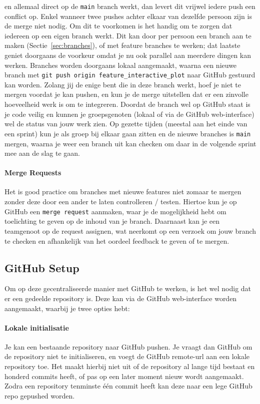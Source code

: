 en allemaal direct op de \texttt{main} branch werkt, dan levert dit vrijwel iedere push een conflict op. Enkel wanneer twee pushes achter elkaar van dezelfde persoon zijn is de merge niet nodig. Om dit te voorkomen is het handig om te zorgen dat iedereen op een eigen branch werkt. Dit kan door per persoon een branch aan te maken (Sectie~\ref{sec:branches}), of met feature branches te werken; dat laatste geniet doorgaans de voorkeur omdat je nu ook parallel aan meerdere dingen kan werken. Branches worden doorgaans lokaal aangemaakt, waarna een nieuwe branch met \texttt{git push origin feature\_interactive\_plot} naar GitHub gestuurd kan worden. Zolang jij de enige bent die in deze branch werkt, hoef je niet te mergen voordat je kan pushen, en kun je de merge uitstellen dat er een zinvolle hoeveelheid werk is om te integreren. Doordat de branch wel op GitHub staat is je code veilig en kunnen je groepsgenoten (lokaal of via de GitHub web-interface) wel de status van jouw werk zien. Op gezette tijden (meestal aan het einde van een sprint) kun je als groep bij elkaar gaan zitten en de nieuwe branches is \texttt{main} mergen, waarna je weer een branch uit kan checken om daar in de volgende sprint mee aan de slag te gaan.

\paragraph{Merge Requests} Het is good practice om branches met nieuwe features niet zomaar te mergen zonder deze door een ander te laten controlleren / testen. Hiertoe kun je op GitHub een \texttt{merge request} aanmaken, waar je de mogelijkheid hebt om toelichting te geven op de inhoud van je branch. Daarnaast kan je een teamgenoot op de request assignen, wat neerkomt op een verzoek om jouw branch te checken en afhankelijk van het oordeel feedback te geven of te mergen.

\subsection{GitHub Setup}
Om op deze gecentraliseerde manier met GitHub te werken, is het wel nodig dat er een gedeelde repository is. Deze kan via de GitHub web-interface worden aangemaakt, waarbij je twee opties hebt: 
\paragraph{Lokale initialisatie} Je kan een bestaande repository naar GitHub pushen. Je vraagt dan GitHub om de repository niet te initialiseren, en voegt de GitHub remote-url aan een lokale repository toe. Het maakt hierbij niet uit of de repository al lange tijd bestaat en honderd commits heeft, of pas op een later moment nieuw wordt aangemaakt. Zodra een repository tenminste \'e\'en commit heeft kan deze naar een lege GitHub repo gepushed worden.

